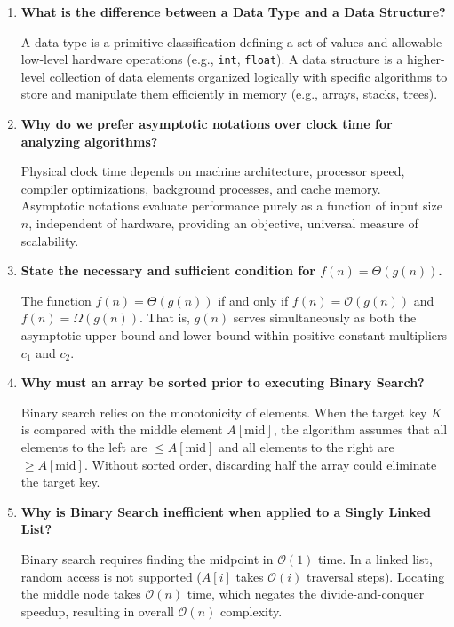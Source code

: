 \documentclass[12pt,a4paper]{article}
\newcommand{\Q}[1]{\textbf{#1}\par\noindent\ignorespaces}
\begin{document}
\begin{tcolorbox}[exambox, title={\textbf{Frequently Asked / Viva Questions (Part 1)}}]
\begin{enumerate}[topsep=0pt, label=\textbf{Q\arabic*.}, itemsep=4pt]
  \item \Q{What is the difference between a Data Type and a Data Structure?}
  A data type is a primitive classification defining a set of values and allowable low-level hardware operations (e.g., \texttt{int}, \texttt{float}). A data structure is a higher-level collection of data elements organized logically with specific algorithms to store and manipulate them efficiently in memory (e.g., arrays, stacks, trees).

  \item \Q{Why do we prefer asymptotic notations over clock time for analyzing algorithms?}
  Physical clock time depends on machine architecture, processor speed, compiler optimizations, background processes, and cache memory. Asymptotic notations evaluate performance purely as a function of input size $n$, independent of hardware, providing an objective, universal measure of scalability.

  \item \Q{State the necessary and sufficient condition for $f(n) = \Theta(g(n))$.}
  The function $f(n) = \Theta(g(n))$ if and only if $f(n) = \mathcal{O}(g(n))$ and $f(n) = \Omega(g(n))$. That is, $g(n)$ serves simultaneously as both the asymptotic upper bound and lower bound within positive constant multipliers $c_1$ and $c_2$.

  \item \Q{Why must an array be sorted prior to executing Binary Search?}
  Binary search relies on the monotonicity of elements. When the target key $K$ is compared with the middle element $A[\text{mid}]$, the algorithm assumes that all elements to the left are $\le A[\text{mid}]$ and all elements to the right are $\ge A[\text{mid}]$. Without sorted order, discarding half the array could eliminate the target key.

  \item \Q{Why is Binary Search inefficient when applied to a Singly Linked List?}
  Binary search requires finding the midpoint in $\mathcal{O}(1)$ time. In a linked list, random access is not supported ($A[i]$ takes $\mathcal{O}(i)$ traversal steps). Locating the middle node takes $\mathcal{O}(n)$ time, which negates the divide-and-conquer speedup, resulting in overall $\mathcal{O}(n)$ complexity.


\end{enumerate}
\end{tcolorbox}
\end{document}
